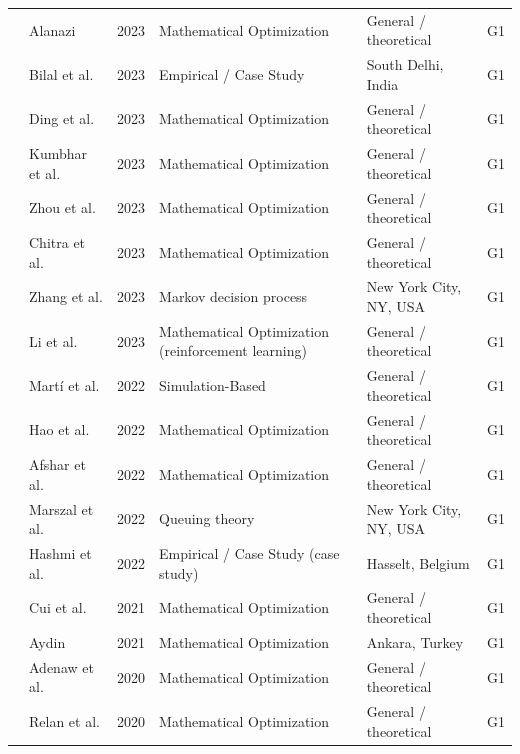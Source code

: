 \documentclass[letterpaper, 12pt, oneside, doublespacing]{Thesis}
\begin{document}
\begin{longtable}{L{0.9cm} L{2.2cm} L{0.8cm} L{3.3cm} L{2.5cm} L{1.5cm}}
\cite{electric_vehicles_2023} & Alanazi & 2023 & Mathematical Optimization & General {\slash} theoretical & G1 \\
\cite{intelligent_algorithm-based_2023} & Bilal et al. & 2023 & Empirical / Case Study & South Delhi, India & G1 \\
\cite{optimal_management_2023} & Ding et al. & 2023 & Mathematical Optimization & General {\slash} theoretical & G1 \\
\cite{optimal_planning_2023} & Kumbhar et al. & 2023 & Mathematical Optimization & General {\slash} theoretical & G1 \\
\cite{planning_of_2023} & Zhou et al. & 2023 & Mathematical Optimization & General {\slash} theoretical & G1 \\
\cite{retracted_charging_2023} & Chitra et al. & 2023 & Mathematical Optimization & General {\slash} theoretical & G1 \\
\cite{routing_and_2023} & Zhang et al. & 2023 & Markov decision process & New York City, NY, USA & G1 \\
\cite{smart_and_2023} & Li et al. & 2023 & Mathematical Optimization (reinforcement learning) & General {\slash} theoretical & G1 \\
\cite{charging_stations_2022} & Mart\'i et al. & 2022 & Simulation-Based & General {\slash} theoretical & G1 \\
\cite{integrated_electric_2022} & Hao et al. & 2022 & Mathematical Optimization & General {\slash} theoretical & G1 \\
\cite{mobile_charging_2022} & Afshar et al. & 2022 & Mathematical Optimization & General {\slash} theoretical & G1 \\
\cite{phase_separation_2022} & Marszal et al. & 2022 & Queuing theory & New York City, NY, USA & G1 \\
\cite{wecharge_democratizing_2022} & Hashmi et al. & 2022 & Empirical / Case Study (case study) & Hasselt, Belgium & G1 \\
\cite{optimal_pricing_2021} & Cui et al. & 2021 & Mathematical Optimization & General {\slash} theoretical & G1 \\
\cite{secure_charging_2021} & Aydin & 2021 & Mathematical Optimization & Ankara, Turkey & G1 \\
\cite{a_model_2020} & Adenaw et al. & 2020 & Mathematical Optimization & General {\slash} theoretical & G1 \\
\cite{optimal_siting_2020} & Relan et al. & 2020 & Mathematical Optimization & General {\slash} theoretical & G1 \\

\end{longtable}
\end{document}
